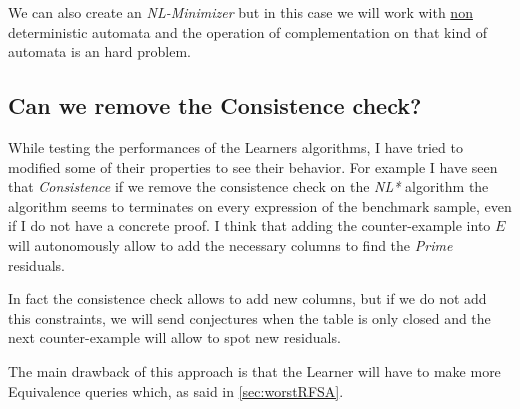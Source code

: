 We can also create an \textit{NL-Minimizer} but in this case we will work with \underline{non} deterministic automata and the operation of complementation on that kind of automata is an hard problem.

\subsection{Can we remove the Consistence check?}

While testing the performances of the Learners algorithms, I have tried to modified some of their properties to see their behavior. For example I have seen that \textit{Consistence} if we remove the consistence check on the \textit{NL*} algorithm the algorithm seems to terminates on every expression of the benchmark sample, even if I do not have a concrete proof. I think that adding the counter-example into $E$ will autonomously allow to add the necessary columns to find the \textit{Prime} residuals.

In fact the consistence check allows to add new columns, but if we do not add this constraints, we will send conjectures when the table is only closed and the next counter-example will allow to spot new residuals.

The main drawback of this approach is that the Learner will have to make more Equivalence queries which, as said in \cref{sec:worstRFSA}.
